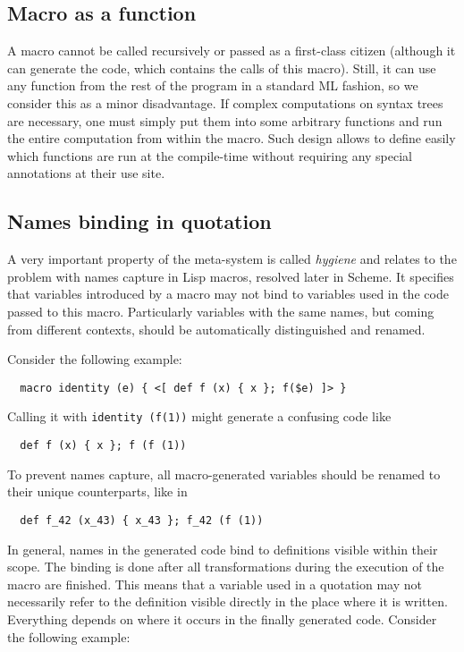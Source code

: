 \documentclass{llncs}
\begin{document}
\subsection{Macro as a function}
A macro cannot be called recursively or passed as a first-class citizen
(although it can generate the code, which contains the calls of this macro).
Still, it can use any function from the rest of the program in a standard ML
fashion, so we consider this as a minor disadvantage. If complex 
computations on syntax trees are necessary, one must simply put them 
into some arbitrary functions and run the entire computation from within 
the macro. Such design allows to define easily which functions are run 
at the compile-time without requiring any special annotations at their use site.

\subsection{Names binding in quotation}
A very important property of the meta-system is called \emph{hygiene} 
and relates to the problem with names capture in Lisp macros, resolved 
later in Scheme. It specifies that variables introduced by a macro 
may not bind to variables used in the code passed to this macro. Particularly 
variables with the same names, but coming from different contexts, should be 
automatically distinguished and renamed.

Consider the following example:

\begin{verbatim}
  macro identity (e) { <[ def f (x) { x }; f($e) ]> }
\end{verbatim} %

Calling it with \verb,identity (f(1)), might generate a confusing code like

\begin{verbatim}
  def f (x) { x }; f (f (1))
\end{verbatim}

To prevent names capture, all macro-generated variables should be renamed 
to their unique counterparts, like in

\begin{verbatim}
  def f_42 (x_43) { x_43 }; f_42 (f (1))
\end{verbatim}

In general, names in the generated code bind to definitions visible within 
their scope. The binding is done after all transformations during the execution
of the macro are finished. This means that a variable used in a quotation 
may not necessarily refer to the definition visible directly in the place 
where it is written. Everything depends on where it occurs in the finally 
generated code. Consider the following example:
\end{document}
